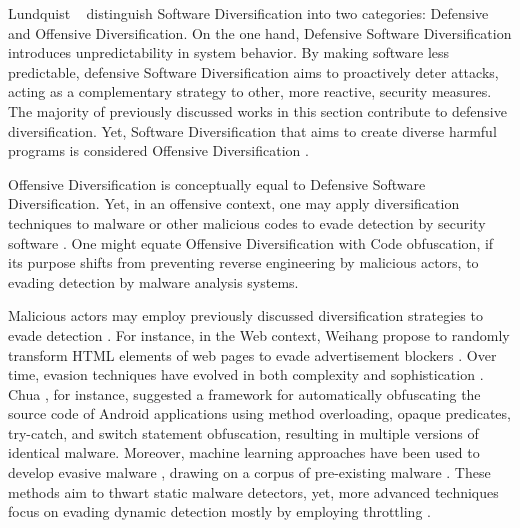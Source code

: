 \label{offensive_definition}

Lundquist \etal~\cite{offensive_div} distinguish Software Diversification into two categories: Defensive and Offensive Diversification. 
On the one hand, Defensive Software Diversification introduces unpredictability in system behavior. 
By making software less predictable, defensive Software Diversification aims to proactively deter attacks, acting as a complementary strategy to other, more reactive, security measures. 
The majority of previously discussed works in this section contribute to defensive diversification.
Yet, Software Diversification that aims to create diverse harmful programs is considered Offensive Diversification \cite{fred1986computer}.


\begin{strategy}   
    Offensive Diversification is conceptually equal to Defensive Software Diversification.
    Yet, in an offensive context, one may apply diversification techniques to malware or other malicious codes to evade detection by security software \cite{8714698}.
    One might equate Offensive Diversification with Code obfuscation, if its purpose shifts from preventing reverse engineering by malicious actors, to evading detection by malware analysis systems.
    
    
\end{strategy}


Malicious actors may employ previously discussed diversification strategies to evade detection \cite{castro2019aimed}.
For instance, in the Web context, Weihang \etal propose to randomly transform HTML elements of web pages to evade advertisement blockers \cite{webranz}.
Over time, evasion techniques have evolved in both complexity and sophistication \cite{Aghakhani2020WhenMI}.
Chua \etal \cite{chua}, for instance, suggested a framework for automatically obfuscating the source code of Android applications using method overloading, opaque predicates, try-catch, and switch statement obfuscation, resulting in multiple versions of identical malware.
Moreover, machine learning approaches have been used to develop evasive malware \cite{2021arXiv211111487D}, drawing on a corpus of pre-existing malware \cite{Bostani2021EvadeDroidAP}.
These methods aim to thwart static malware detectors, yet, more advanced techniques focus on evading dynamic detection mostly by employing throttling \cite{Lu2013WeaknessesID, payer2014embracing}.


